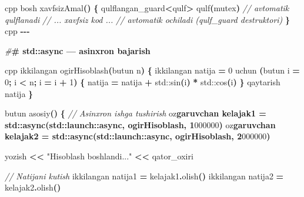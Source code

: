 \documentclass[a4paper,11pt,twoside,openright]{book}
\newenvironment{Shaded}{\begin{snugshade}}{\end{snugshade}}
\newcommand{\BaseNTok}[1]{\textcolor[rgb]{0.00,0.00,0.81}{#1}}
\newcommand{\BuiltInTok}[1]{#1}
\newcommand{\CharTok}[1]{\textcolor[rgb]{0.31,0.60,0.02}{#1}}
\newcommand{\CommentTok}[1]{\textcolor[rgb]{0.56,0.35,0.01}{\textit{#1}}}
\newcommand{\DecValTok}[1]{\textcolor[rgb]{0.00,0.00,0.81}{#1}}
\newcommand{\ErrorTok}[1]{\textcolor[rgb]{0.64,0.00,0.00}{\textbf{#1}}}
\newcommand{\NormalTok}[1]{#1}
\newcommand{\OperatorTok}[1]{\textcolor[rgb]{0.81,0.36,0.00}{\textbf{#1}}}
\newcommand{\PreprocessorTok}[1]{\textcolor[rgb]{0.56,0.35,0.01}{\textit{#1}}}
\newcommand{\StringTok}[1]{\textcolor[rgb]{0.31,0.60,0.02}{#1}}
\begin{document}
\begin{Shaded}
\begin{Highlighting}[]
\ErrorTok{\textasciigrave{}\textasciigrave{}\textasciigrave{}}\NormalTok{cpp}
\NormalTok{bosh xavfsizAmal}\OperatorTok{()} \OperatorTok{\{}
\NormalTok{    qulflangan\_guard}\OperatorTok{\textless{}}\NormalTok{qulf}\OperatorTok{\textgreater{}}\NormalTok{ qulf}\OperatorTok{(}\NormalTok{mutex}\OperatorTok{)}   \CommentTok{// avtomatik qulflanadi}
    \CommentTok{// ... xavfsiz kod ...}
    \CommentTok{// avtomatik ochiladi (qulf\_guard destruktori)}
\OperatorTok{\}}
\ErrorTok{\textasciigrave{}\textasciigrave{}\textasciigrave{}}\NormalTok{cpp}
\OperatorTok{{-}{-}{-}}

\PreprocessorTok{\#}\ErrorTok{\# \textasciigrave{}std::async\textasciigrave{} — asinxron bajarish}

\ErrorTok{\textasciigrave{}\textasciigrave{}\textasciigrave{}}\NormalTok{cpp}
\NormalTok{ikkilangan ogirHisoblash}\OperatorTok{(}\NormalTok{butun n}\OperatorTok{)} \OperatorTok{\{}
\NormalTok{    ikkilangan natija }\OperatorTok{=} \DecValTok{0}
\NormalTok{    uchun }\OperatorTok{(}\NormalTok{butun i }\OperatorTok{=} \DecValTok{0}\OperatorTok{;}\NormalTok{ i }\OperatorTok{\textless{}}\NormalTok{ n}\OperatorTok{;}\NormalTok{ i }\OperatorTok{=}\NormalTok{ i }\OperatorTok{+} \DecValTok{1}\OperatorTok{)} \OperatorTok{\{}
\NormalTok{        natija }\OperatorTok{=}\NormalTok{ natija }\OperatorTok{+} \BuiltInTok{std::}\NormalTok{sin}\OperatorTok{(}\NormalTok{i}\OperatorTok{)} \OperatorTok{*} \BuiltInTok{std::}\NormalTok{cos}\OperatorTok{(}\NormalTok{i}\OperatorTok{)}
    \OperatorTok{\}}
\NormalTok{    qaytarish natija}
\OperatorTok{\}}

\NormalTok{butun asosiy}\OperatorTok{()} \OperatorTok{\{}
    \CommentTok{// Asinxron ishga tushirish}
\NormalTok{    o}\CharTok{\textquotesingle{}z}\ErrorTok{garuvchan kelajak1 = std::async(std::launch::async, ogirHisoblash, 1}\CharTok{\textquotesingle{}}\BaseNTok{000\textquotesingle{}000}\OperatorTok{)}
\NormalTok{    o}\CharTok{\textquotesingle{}z}\ErrorTok{garuvchan kelajak2 = std::async(std::launch::async, ogirHisoblash, 2}\CharTok{\textquotesingle{}}\BaseNTok{000\textquotesingle{}000}\OperatorTok{)}

\NormalTok{    yozish }\OperatorTok{\textless{}\textless{}} \StringTok{"Hisoblash boshlandi..."} \OperatorTok{\textless{}\textless{}}\NormalTok{ qator\_oxiri}

    \CommentTok{// Natijani kutish}
\NormalTok{    ikkilangan natija1 }\OperatorTok{=}\NormalTok{ kelajak1}\OperatorTok{.}\NormalTok{olish}\OperatorTok{()}
\NormalTok{    ikkilangan natija2 }\OperatorTok{=}\NormalTok{ kelajak2}\OperatorTok{.}\NormalTok{olish}\OperatorTok{()}


\end{Highlighting}
\end{Shaded}
\end{document}
